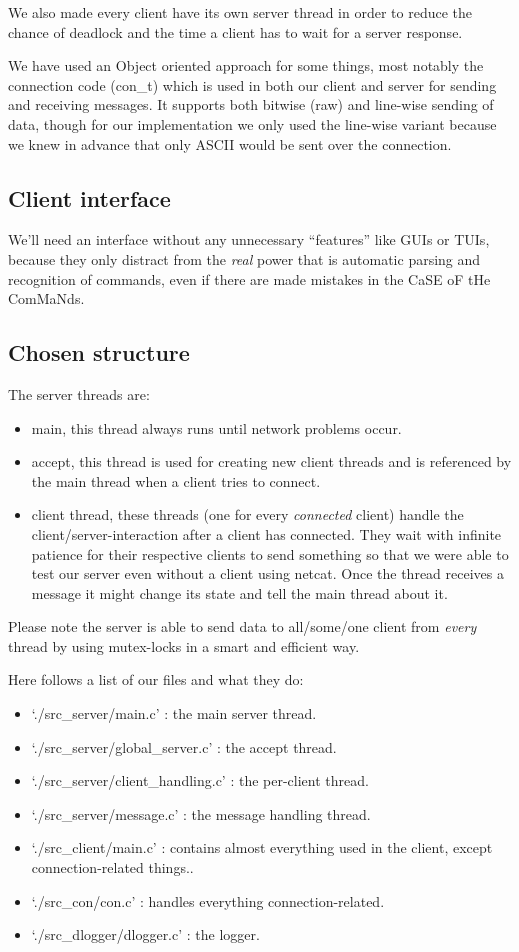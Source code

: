 \documentclass[a4paper]{article}
\begin{document}
We also made every client have its own server thread in order to reduce the
chance of deadlock and the time a client has to wait for a server response.

We have used an Object oriented approach for some things, most notably the
connection code (con\_t) which is used in both our client and server for sending
and receiving messages. It supports both bitwise (raw) and
line-wise sending of data, though for our implementation we only used the
line-wise variant because we knew in advance that only ASCII would be sent over
the connection.
\subsection{Client interface}
We'll need an interface without any unnecessary ``features'' like GUIs or TUIs,
because they only distract from the \emph{real} power that is automatic parsing
and recognition of commands, even if there are made mistakes in the CaSE oF tHe
ComMaNds.

\subsection{Chosen structure}
The server threads are:
\begin{itemize}
\item main, this thread always runs until network problems occur.
\item accept, this thread is used for creating new client threads and is
referenced by the main thread when a client tries to connect.
\item client thread, these threads (one for every \emph{connected} client)
handle the client/server-interaction after a client has connected. They wait
with infinite patience for their respective clients to send something so that
we were able to test our server even without a client using netcat. Once the
thread receives a message it might change its state and tell the main thread
about it.
\end{itemize}

Please note the server is able to send data to all/some/one client from
\emph{every} thread by using mutex-locks in a smart and efficient way.

Here follows a list of our files and what they do:
\begin{itemize}
\item `./src\_server/main.c' : the main server thread.
\item `./src\_server/global\_server.c' : the accept thread.
\item `./src\_server/client\_handling.c' : the per-client thread.
\item `./src\_server/message.c' : the message handling thread.

\item `./src\_client/main.c' : contains almost everything used in the client,
except connection-related things..

\item `./src\_con/con.c' : handles everything connection-related.

\item `./src\_dlogger/dlogger.c' : the logger.
\end{itemize}
\end{document}

